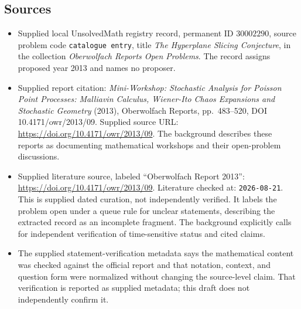 \documentclass[11pt]{article}
\begin{document}
\subsection{Sources}
\begin{itemize}
\item Supplied local UnsolvedMath registry record, permanent ID \(30002290\), source problem code \texttt{catalogue entry}, title \emph{The Hyperplane Slicing Conjecture}, in the collection \emph{Oberwolfach Reports Open Problems}. The record assigns proposed year 2013 and names no proposer.
\item Supplied report citation: \emph{Mini-Workshop: Stochastic Analysis for Poisson Point Processes: Malliavin Calculus, Wiener-Ito Chaos Expansions and Stochastic Geometry} (2013), Oberwolfach Reports, pp.\ 483--520, DOI 10.4171/owr/2013/09. Supplied source URL: \url{https://doi.org/10.4171/owr/2013/09}. The background describes these reports as documenting mathematical workshops and their open-problem discussions.
\item Supplied literature source, labeled ``Oberwolfach Report 2013'': \url{https://doi.org/10.4171/owr/2013/09}. Literature checked at: \texttt{2026-08-21}. This is supplied dated curation, not independently verified. It labels the problem open under a queue rule for unclear statements, describing the extracted record as an incomplete fragment. The background explicitly calls for independent verification of time-sensitive status and cited claims.
\item The supplied statement-verification metadata says the mathematical content was checked against the official report and that notation, context, and question form were normalized without changing the source-level claim. That verification is reported as supplied metadata; this draft does not independently confirm it.
\end{itemize}
\end{document}

